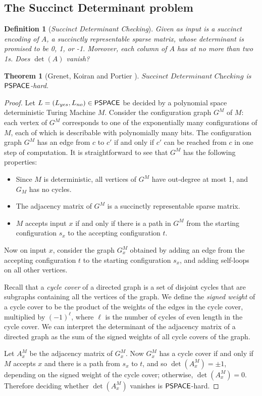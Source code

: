 \documentclass[11pt]{article}
\newtheorem{theorem}{Theorem}
\newtheorem{definition}{Definition}
\theoremstyle{definition}
\theoremstyle{remark}
\newcommand\PSPACE{{\sf{PSPACE}}}
\newcommand\succdet{\textit{Succinct Determinant Checking}}
\begin{document}
\subsection{The Succinct Determinant problem}
\begin{definition}[\succdet]
Given as input is a succinct encoding of $A$, a succinctly representable sparse matrix, whose determinant is promised to be 0, 1, or -1. Moreover, each column of $A$ has at no more than two 1s.  Does $\det(A)$ vanish?
\end{definition}
\begin{theorem}[Grenet, Koiran and Portier \cite{GKP13}]\label{thm:succdet}
$\succdet$ is $\PSPACE$-hard.
\end{theorem}
\begin{proof}
Let $L=(L_{yes},L_{no}) \in \PSPACE$ be decided by a polynomial space deterministic Turing Machine $M$. Consider the configuration graph $G^M$ of $M$: each vertex of $G^M$ corresponds to one of the exponentially many configurations of $M$, each of which is describable with polynomially many bits. The configuration graph $G^M$ has an edge from $c$ to $c'$ if and only if $c'$ can be reached from $c$ in one step of computation. It is straightforward to see that $G^M$ has the following properties:
\begin{itemize}
\item Since $M$ is deterministic, all vertices of $G^M$ have out-degree at most 1, and $G_M$ has no cycles.
\item The adjacency matrix of $G^M$ is a succinctly representable sparse matrix.
\item $M$ accepts input $x$ if and only if there is a path in $G^M$ from the starting configuration $s_x$ to the accepting configuration $t$.
\end{itemize}

Now on input $x$, consider the graph $G^M_x$ obtained by adding an edge from the accepting configuration $t$ to the starting configuration $s_x$, and adding self-loops on all other vertices. 

Recall that a {\sl cycle cover} of a directed graph is a set of disjoint cycles that are subgraphs containing all the vertices of the graph.  We define the {\sl signed weight} of a cycle cover to be the product of the weights of the edges in the cycle cover, multiplied by $(-1)^\ell$, where $\ell$ is the number of cycles of even length in the cycle cover.  We can interpret the determinant of the adjacency matrix of a directed graph as the sum of the signed weights of all cycle covers of the graph. 

Let $A^M_x$ be the adjacency matrix of $G_x^M$.  Now $G^M_x$ has a cycle cover if and only if $M$ accepts $x$ and there is a path from $s_x$ to $t$, and so $\det(A^M_x) = \pm 1$, depending on the signed weight of the cycle cover; otherwise, $\det(A^M_x) = 0$. Therefore deciding whether $\det(A^M_x)$ vanishes is $\PSPACE$-hard.	
\end{proof}
\end{document}
